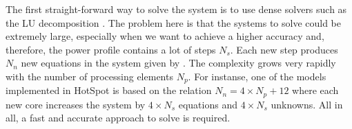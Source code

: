 The first straight-forward way to solve the system is to use dense solvers such as the LU decomposition \cite{press2007}. The problem here is that the systems to solve could be extremely large, especially when we want to achieve a higher accuracy and, therefore, the power profile contains a lot of steps $N_s$. Each new step produces $N_n$ new equations in the system given by . The complexity grows very rapidly with the number of processing elements $N_p$. For instanse, one of the models implemented in HotSpot is based on the relation $N_n = 4 \times N_p + 12$ where each new core increases the system by $4 \times N_s$ equations and $4 \times N_s$ unknowns. All in all, a fast and accurate approach to solve  is required.
